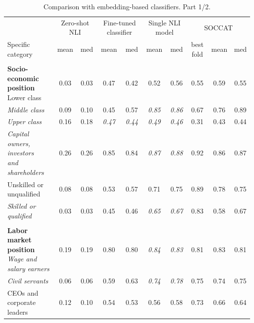\begin{table}[htb]
\centering
\renewcommand{\arraystretch}{0.9}
\scriptsize
\begin{threeparttable}
\caption{Comparison with embedding-based classifiers. Part 1/2.}
\label{tab:embedding_baselines_part1}
\begin{tabular}{l c c c c c c c c c}
\toprule
 & \multicolumn{2}{c}{Zero-shot NLI} & \multicolumn{2}{c}{Fine-tuned classifier} & \multicolumn{2}{c}{Single NLI model} & \multicolumn{3}{c}{SOCCAT} \\
\cmidrule(lr){2-3} \cmidrule(lr){4-5} \cmidrule(lr){6-7} \cmidrule(lr){8-10}
Specific category & \multicolumn{1}{c}{mean} & \multicolumn{1}{c}{med} & \multicolumn{1}{c}{mean} & \multicolumn{1}{c}{med} & \multicolumn{1}{c}{mean} & \multicolumn{1}{c}{med} & \multicolumn{1}{c}{best fold} & \multicolumn{1}{c}{mean} & \multicolumn{1}{c}{med} \\
\midrule
\rule{0pt}{5pt} &  &  &  &  &  &  &  &  &  \\
\shortstack[l]{\textbf{Socio-economic position}\\[3pt]Lower class} & 0.03 & 0.03 & 0.47 & 0.42 & 0.52 & 0.56 & 0.55 & 0.59 & 0.55 \\
\textit{Middle class} & 0.09 & 0.10 & 0.45 & 0.57 & \textit{0.85} & \textit{0.86} & 0.67 & 0.76 & 0.89 \\
\textit{Upper class} & 0.16 & 0.18 & \textit{0.47} & \textit{0.44} & \textit{0.49} & \textit{0.46} & 0.31 & 0.43 & 0.44 \\
\shortstack[l]{\textit{Capital owners, investors}\\[-3pt]\textit{and shareholders}} & 0.26 & 0.26 & 0.85 & 0.84 & \textit{0.87} & \textit{0.88} & 0.92 & 0.86 & 0.87 \\
Unskilled or unqualified & 0.08 & 0.08 & 0.53 & 0.57 & 0.71 & 0.75 & 0.89 & 0.78 & 0.75 \\
\textit{Skilled or qualified} & 0.03 & 0.03 & 0.45 & 0.46 & \textit{0.65} & \textit{0.67} & 0.83 & 0.58 & 0.67 \\
\rule{0pt}{5pt} &  &  &  &  &  &  &  &  &  \\
\shortstack[l]{\textbf{Labor market position}\\[3pt]\textit{Wage and salary earners}} & 0.19 & 0.19 & 0.80 & 0.80 & \textit{0.84} & \textit{0.83} & 0.81 & 0.83 & 0.81 \\
\textit{Civil servants} & 0.06 & 0.06 & 0.59 & 0.63 & \textit{0.74} & \textit{0.78} & 0.75 & 0.74 & 0.75 \\
\shortstack[l]{CEOs and\\[-3pt]corporate leaders} & 0.12 & 0.10 & 0.54 & 0.53 & 0.56 & 0.58 & 0.73 & 0.66 & 0.64 \\

\end{tabular}
\end{threeparttable}
\end{table}
